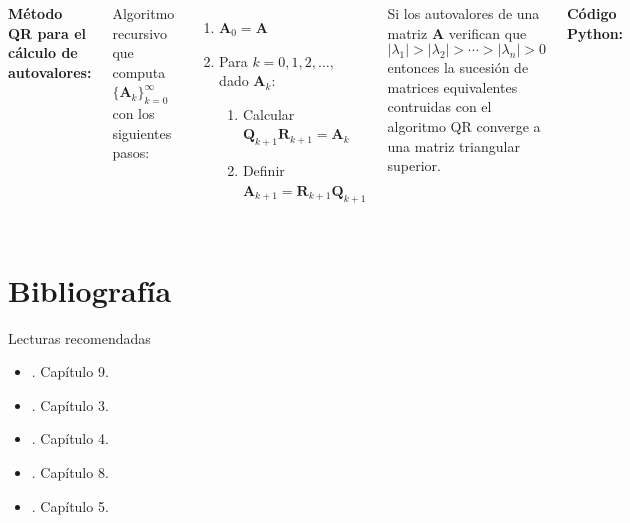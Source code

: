 \documentclass[9pt, aspectratio=169]{beamer}
\begin{document}
\begin{frame}
\begin{columns}[t]
\textbf{Método QR para el cálculo de autovalores:} %

Algoritmo recursivo que computa $\{ \bm{A}_k \}_{k = 0}^{\infty}$ con los siguientes pasos:
\begin{enumerate}
    \item $\bm{A}_0 = \bm{A}$
    \item Para $k = 0, 1, 2, \ldots,$ dado $\bm{A}_k$:
        \begin{enumerate}
        \item Calcular $\bm{Q}_{k+1} \bm{R}_{k+1} = \bm{A}_k $
        \item Definir $\bm{A}_{k+1} = \bm{R}_{k+1} \bm{Q}_{k+1}$
        \end{enumerate}
\end{enumerate} \pause

\begin{theorem}[Convergencia]
    Si los autovalores de una matriz $\bm{A}$ verifican que
    \[ |\lambda_1| > |\lambda_2| > \cdots > |\lambda_n| > 0 \]
    entonces la sucesión de matrices equivalentes contruidas con el algoritmo QR converge a una matriz triangular superior.
\end{theorem}

\textbf{Código Python:}

\end{columns}
\end{frame}



\section*{Bibliografía}
\begin{frame}[allowframebreaks]{Lecturas recomendadas}
\begin{itemize}
    \item {}. Capítulo 9.
    \item {}. Capítulo 3.
    \item {}. Capítulo 4.
    \item {}. Capítulo 8.
    \item {}. Capítulo 5.
\end{itemize}
\end{frame}
\end{document}
